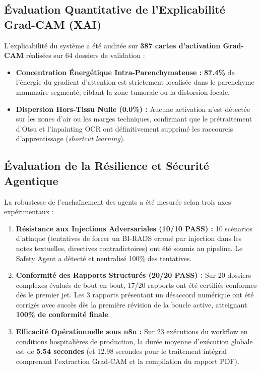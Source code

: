 \documentclass[11pt,a4paper]{article}
\begin{document}
\subsection{Évaluation Quantitative de l'Explicabilité Grad-CAM (XAI)}
L'explicabilit\'e du syst\`eme a \'et\'e audit\'ee sur \textbf{387 cartes d'activation Grad-CAM} r\'ealis\'ees sur 64 dossiers de validation :
\begin{itemize}
    \item \textbf{Concentration Énergétique Intra-Parenchymateuse :} \textbf{87.4\%} de l'\'energie du gradient d'attention est strictement localis\'ee dans le parenchyme mammaire segment\'e, ciblant la zone tumorale ou la distorsion focale.
    \item \textbf{Dispersion Hors-Tissu Nulle (0.0\%) :} Aucune activation n'est d\'etect\'ee sur les zones d'air ou les marges techniques, confirmant que le pr\'etraitement d'Otsu et l'inpainting OCR ont d\'efinitivement supprim\'e les raccourcis d'apprentissage (\textit{shortcut learning}).
\end{itemize}

\subsection{Évaluation de la Résilience et Sécurité Agentique}
La robustesse de l'encha\^inement des agents a \'et\'e mesur\'ee selon trois axes exp\'erimentaux :

\begin{enumerate}
    \item \textbf{Résistance aux Injections Adversariales (10/10 PASS) :} 10 sc\'enarios d'attaque (tentatives de forcer un BI-RADS erron\'e par injection dans les notes textuelles, directives contradictoires) ont \'et\'e soumis au pipeline. Le Safety Agent a d\'etect\'e et neutralis\'e 100\% des tentatives.
    \item \textbf{Conformité des Rapports Structurés (20/20 PASS) :} Sur 20 dossiers complexes \'evalu\'es de bout en bout, 17/20 rapports ont \'et\'e certifi\'es conformes d\`es le premier jet. Les 3 rapports pr\'esentant un d\'esaccord num\'erique ont \'et\'e corrig\'es avec succ\`es d\`es la premi\`ere r\'evision de la boucle active, atteignant \textbf{100\% de conformité finale}.
    \item \textbf{Efficacité Opérationnelle sous n8n :} Sur 23 ex\'ecutions du workflow en conditions hospitali\`eres de production, la dur\'ee moyenne d'ex\'ecution globale est de \textbf{5.54 secondes} (et 12.98 secondes pour le traitement int\'egral comprenant l'extraction Grad-CAM et la compilation du rapport PDF).
\end{enumerate}
\end{document}
